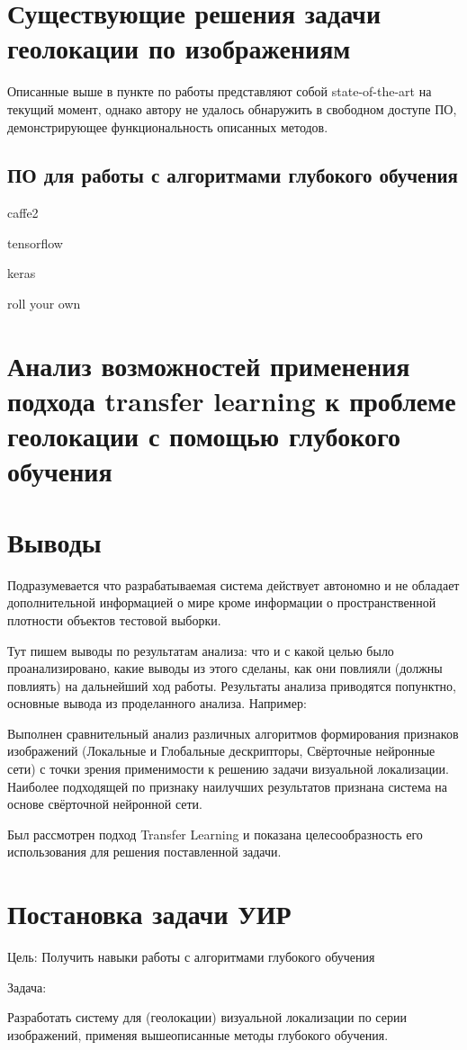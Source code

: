 \section{Существующие решения задачи геолокации по изображениям}

Описанные выше в пункте по работы \cite{weyand2016planet} представляют собой state-of-the-art на текущий момент, однако автору не удалось обнаружить в свободном доступе ПО, демонстрирующее функциональность описанных методов.

\subsection{ПО для работы с алгоритмами глубокого обучения}

caffe2

tensorflow

keras

roll your own

\section{Анализ возможностей применения подхода transfer learning к проблеме геолокации с помощью глубокого обучения}



\section{Выводы}

Подразумевается что разрабатываемая система действует автономно и не обладает дополнительной информацией о мире кроме информации о пространственной плотности объектов тестовой выборки.

Тут пишем выводы по результатам анализа: что и с какой целью было проанализировано, какие выводы из этого сделаны, как они повлияли (должны повлиять) на дальнейший ход работы. Результаты анализа приводятся попунктно, основные вывода из проделанного анализа. Например:

\begin{compactenum}
	\item Выполнен сравнительный анализ различных алгоритмов формирования признаков изображений (Локальные и Глобальные дескрипторы, Свёрточные нейронные сети) с точки зрения применимости к решению задачи визуальной локализации. Наиболее подходящей по признаку наилучших результатов признана система на основе свёрточной нейронной сети.
	\item Был рассмотрен подход Transfer Learning и показана целесообразность его использования для решения поставленной задачи.
	\item 
\end{compactenum}



\section{Постановка задачи УИР}

Цель:
Получить навыки работы с алгоритмами глубокого обучения

Задача:

Разработать систему для (геолокации) визуальной локализации по серии изображений, применяя вышеописанные методы глубокого обучения.

